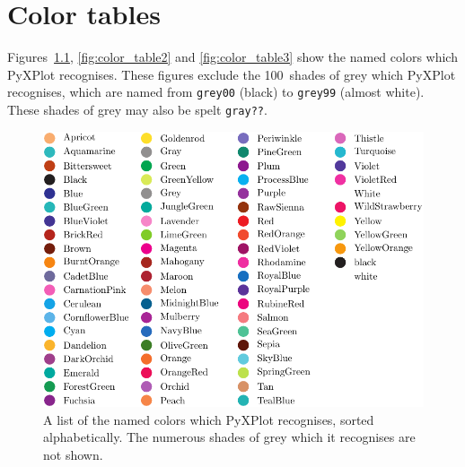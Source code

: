 %
%
%
%
%



\chapter{Color tables}
\label{ch:color_charts}

 Figures~\ref{fig:color_table1}, \ref{fig:color_table2}
and \ref{fig:color_table3} show the named colors which PyXPlot recognises.
These figures exclude the 100~shades of grey which PyXPlot recognises, which
are named from {\tt grey00} (black) to {\tt grey99} (almost white).  These
shades of grey may also be spelt {\tt gray??}.  

\begin{figure}
\begin{center}
\includegraphics[width=\textwidth]{figures/pyx_colors2}
\end{center}
\caption[A list of the named colors which PyXPlot recognises, sorted alphabetically]
{A list of the named colors which PyXPlot recognises, sorted alphabetically. The numerous shades of grey which it recognises are not shown.}
\label{fig:color_table1}
\end{figure}

